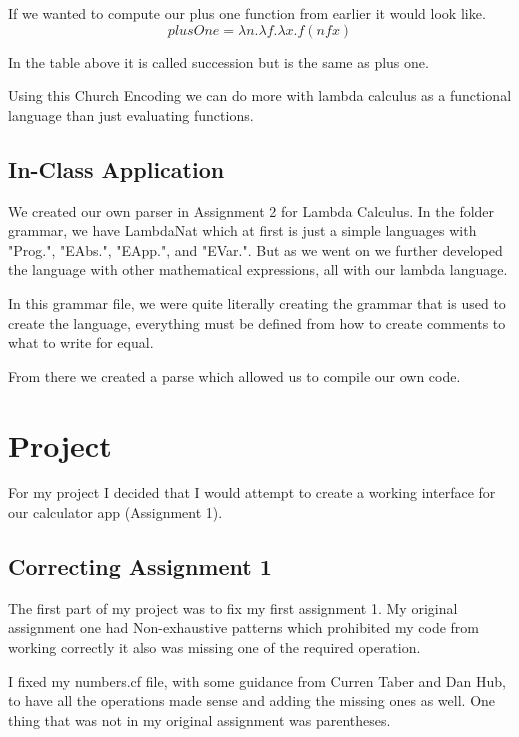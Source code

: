 \documentclass{article}
\begin{document}
\medskip\noindent
If we wanted to compute our plus one function from earlier it would look like.
$$ plusOne = \lambda n.\lambda f. \lambda x. f (n f x)$$

\medskip\noindent
In the table above it is called succession but is the same as plus one. 

\medskip\noindent
Using this Church Encoding we can do more with lambda calculus as a functional language than just evaluating functions.

\subsection{In-Class Application}

\medskip\noindent 
We created our own parser in Assignment 2 for Lambda Calculus. In the folder grammar, we have LambdaNat which at first is just a simple languages with "Prog.", "EAbs.", "EApp.", and "EVar.". But as we went on we further developed the language with other mathematical expressions, all with our lambda language. 

\medskip\noindent
In this grammar file, we were quite literally creating the grammar that is used to create the language, everything must be defined from how to create comments to what to write for equal.

\medskip\noindent
From there we created a parse which allowed us to compile our own code. 

\section{Project}

\medskip\noindent 
For my project I decided that I would attempt to create a working interface for our calculator app (Assignment 1). 

\subsection{Correcting Assignment 1}

\medskip\noindent 
The first part of my project was to fix my first assignment 1. My original assignment one had Non-exhaustive patterns which prohibited my code from working correctly it also was missing one of the required operation. 

\medskip\noindent 
I fixed my numbers.cf file, with some guidance from Curren Taber and Dan Hub, to have all the operations made sense and adding the missing ones as well. One thing that was not in my original assignment was parentheses. 
\end{document}
